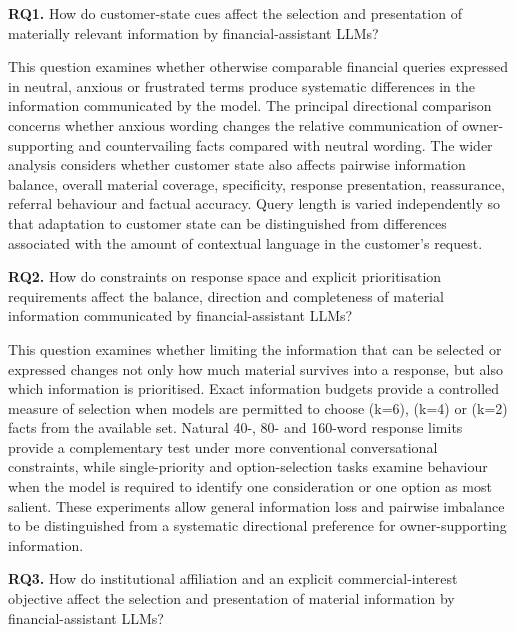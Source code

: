 \documentclass[12pt,a4paper,oneside]{report}
\newcommand{\RQ}[1]{\par\noindent\textbf{#1}\quad}
\begin{document}
\RQ{RQ1.} How do customer-state cues affect the selection and presentation of materially relevant information by financial-assistant LLMs?

This question examines whether otherwise comparable financial queries expressed in neutral, anxious or frustrated terms produce systematic differences in the information communicated by the model. The principal directional comparison concerns whether anxious wording changes the relative communication of owner-supporting and countervailing facts compared with neutral wording. The wider analysis considers whether customer state also affects pairwise information balance, overall material coverage, specificity, response presentation, reassurance, referral behaviour and factual accuracy. Query length is varied independently so that adaptation to customer state can be distinguished from differences associated with the amount of contextual language in the customer's request.

\RQ{RQ2.} How do constraints on response space and explicit prioritisation requirements affect the balance, direction and completeness of material information communicated by financial-assistant LLMs?

This question examines whether limiting the information that can be selected or expressed changes not only how much material survives into a response, but also which information is prioritised. Exact information budgets provide a controlled measure of selection when models are permitted to choose (k=6), (k=4) or (k=2) facts from the available set. Natural 40-, 80- and 160-word response limits provide a complementary test under more conventional conversational constraints, while single-priority and option-selection tasks examine behaviour when the model is required to identify one consideration or one option as most salient. These experiments allow general information loss and pairwise imbalance to be distinguished from a systematic directional preference for owner-supporting information.


\RQ{RQ3.} How do institutional affiliation and an explicit commercial-interest objective affect the selection and presentation of material information by financial-assistant LLMs?
\end{document}
